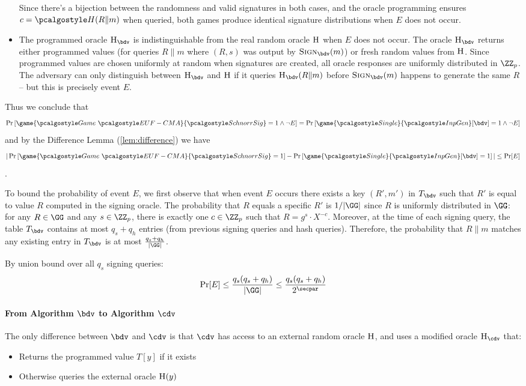 \begin{mysolution}
\begin{itemize}
    Since there's a bijection between the randomness and valid signatures in both cases, and the oracle programming ensures $c = \algo{H}(R \| m)$ when
  queried, both games produce identical signature distributions when $E$ does not occur.
  \item The programmed oracle $\pcoracle{H}_{\bdv}$ is indistinguishable from the real random oracle ${\normalfont\textsc{H}}$ when $E$ does not occur. The oracle
  $\pcoracle{H}_{\bdv}$ returns either programmed values (for queries $R \| m$ where $(R, s)$ was output by $\pcoracle{Sign}_{\bdv}(m)$) or fresh random
  values from ${\normalfont\textsc{H}}$. Since programmed values are chosen uniformly at random when signatures are created, all oracle responses are uniformly
  distributed in $\ZZ_p$. The adversary can only distinguish between $\pcoracle{H}_{\bdv}$ and ${\normalfont\textsc{H}}$ if it queries $\pcoracle{H}_{\bdv}(R \| m)$
  before $\pcoracle{Sign}_{\bdv}(m)$ happens to generate the same $R$ – but this is precisely event $E$.
  \end{itemize}

  Thus we conclude that
  \[
    \pr{\game{\Game~\algo{EUF-CMA}}{\algo{SchnorrSig}} = 1 \wedge \neg E} =  \pr{\game{\algo{Single}}{\algo{InpGen}}[\bdv] = 1 \wedge \neg E}
  \] and by the Difference Lemma (\autoref{lem:difference}) we have
  \[
    |\pr{\game{\Game~\algo{EUF-CMA}}{\algo{SchnorrSig}} = 1} - \pr{\game{\algo{Single}}{\algo{InpGen}}[\bdv] = 1}| \leq \Pr[E]
  \].

  To bound the probability of event $E$, we first observe that when event $E$ occurs there exists a key $(R', m')$ in $T_{\bdv}$ such that $R'$ is equal to value $R$ computed in the signing oracle.
  The probability that $R$ equals a specific $R'$ is $1/|\GG|$ since $R$ is uniformly distributed in $\GG$: for any $R \in \GG$ and any $s \in \ZZ_p$, there is exactly one $c \in \ZZ_p$ such that $R = g^s \cdot X^{-c}$.
  Moreover, at the time of each signing query, the table $T_{\bdv}$ contains at most $q_s + q_h$ entries (from previous signing queries and hash queries).
  Therefore, the probability that $R \| m$ matches any existing entry in $T_{\bdv}$ is at most $\frac{q_s + q_h}{|\GG|}$.

  By union bound over all $q_s$ signing queries:
  \[
    \Pr[E] \leq \frac{q_s(q_s + q_h)}{|\GG|} \leq \frac{q_s(q_s + q_h)}{2^\secpar}
  \]

  \paragraph{From Algorithm $\bdv$ to Algorithm $\cdv$}
  The only difference between $\bdv$ and $\cdv$ is that $\cdv$ has access to an external random oracle ${\normalfont\textsc{H}}$, and uses a modified oracle $\pcoracle{H}_{\cdv}$ that:
  \begin{itemize}
    \item Returns the programmed value $T[y]$ if it exists
    \item Otherwise queries the external oracle ${\normalfont\textsc{H}}(y)$
  \end{itemize}


\end{mysolution}
